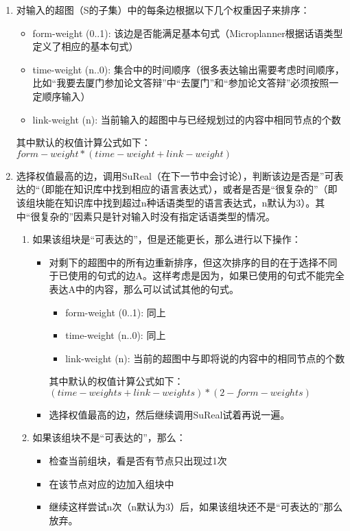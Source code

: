 \begin{enumerate}
\item 对输入的超图（S的子集）中的每条边根据以下几个权重因子来排序：

\begin{itemize}
\item form-weight (0..1): 该边是否能满足基本句式（Microplanner根据话语类型定义了相应的基本句式）
\item time-weight (n..0): 集合中的时间顺序（很多表达输出需要考虑时间顺序，比如“我要去厦门参加论文答辩”中“去厦门”和“参加论文答辩”必须按照一定顺序输入）
\item link-weight (n): 当前输入的超图中与已经规划过的内容中相同节点的个数
\end{itemize}

\noindent 其中默认的权值计算公式如下： $form-weight * (time-weight + link-weight)$

\item 选择权值最高的边，调用SuReal（在下一节中会讨论），判断该边是否是”可表达的“（即能在知识库中找到相应的语言表达式），或者是否是“很复杂的”（即该组块能在知识库中找到超过n种话语类型的语言表达式，n默认为3）。其中“很复杂的”因素只是针对输入时没有指定话语类型的情况。

\begin{enumerate}
\item 如果该组块是“可表达的”，但是还能更长，那么进行以下操作：

\begin{itemize}
\item 对剩下的超图中的所有边重新排序，但这次排序的目的在于选择不同于已使用的句式的边A。这样考虑是因为，如果已使用的句式不能完全表达A中的内容，那么可以试试其他的句式。
\begin{itemize}
\item form-weight (0..1): 同上
\item time-weight (n..0): 同上
\item link-weight (n): 当前的超图中与即将说的内容中的相同节点的个数
\end{itemize}

其中默认的权值计算公式如下： $(time-weights + link-weights) * (2 - form-weights)$

\item 选择权值最高的边，然后继续调用SuReal试着再说一遍。
\end{itemize}
\item 如果该组块不是“可表达的”，那么：
\begin{itemize}
\item 检查当前组块，看是否有节点只出现过1次
\item 在该节点对应的边加入组块中
\item 继续这样尝试n次（n默认为3）后，如果该组块还不是“可表达的”那么放弃。
\end{itemize}
\end{enumerate}
\end{enumerate}

